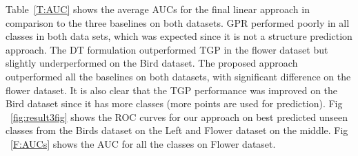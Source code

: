 Table~\ref{T:AUC} shows the average AUCs for the final linear approach in comparison to the three baselines on both datasets. GPR performed poorly in all classes in both data sets, which was expected since it is not a structure prediction approach.  The DT formulation outperformed TGP in the flower dataset but slightly underperformed on the Bird dataset. The proposed approach outperformed all the baselines on both datasets, with significant difference on the flower dataset. It is also clear that the TGP performance was improved on the Bird dataset since it has more classes (more points are used for prediction). Fig ~\ref{fig:result3fig} shows the ROC curves for our approach on best predicted unseen classes from the Birds dataset on the Left  and Flower dataset on the middle. Fig ~\ref{F:AUCs} shows the AUC for all the classes on Flower dataset. %
\begin{comment}
\begin{figure}
\texttt{[image: flower\_top10\_ROC\_final.eps]}
\caption{ROC curves for best predicted classes -- Flower}
\label{F:bestROCs}
\end{figure}
\end{comment}
\begin{comment}
\begin{figure}
\centering
\texttt{[image: birds\_top10\_ROC\_final.eps]}
\caption{ROC curves for best predicted classes -- Birds}
\label{F:bestROCsBIRDS}
\end{figure}
\end{comment}
